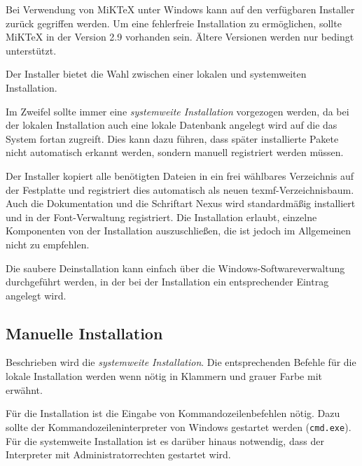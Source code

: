 Bei Verwendung von MiKTeX unter Windows kann auf den verfügbaren Installer
zurück gegriffen werden. Um eine fehlerfreie Installation zu ermöglichen,
sollte MiKTeX in der Version 2.9 vorhanden sein.
Ältere Versionen werden nur bedingt unterstützt.

Der Installer bietet die Wahl zwischen einer lokalen und systemweiten
Installation.
\begin{important}
Im Zweifel sollte immer eine \emph{systemweite Installation}
vorgezogen werden, da bei der lokalen Installation auch eine lokale
Datenbank angelegt wird auf die das System fortan zugreift.
Dies kann dazu führen, dass später installierte Pakete nicht automatisch
erkannt werden, sondern manuell registriert werden müssen.
\end{important}

Der Installer kopiert alle benötigten Dateien in ein frei wählbares Verzeichnis
auf der Festplatte und registriert dies automatisch als neuen texmf-Verzeichnisbaum.
Auch die Dokumentation und die Schriftart Nexus wird standardmäßig installiert
und in der Font-Verwaltung registriert.
Die Installation erlaubt, einzelne Komponenten von der Installation auszuschließen,
die ist jedoch im Allgemeinen nicht zu empfehlen.\par

Die saubere Deinstallation kann einfach über die Windows-Softwareverwaltung 
durchgeführt werden, in der bei der Installation ein entsprechender Eintrag
angelegt wird.

\newcommand\localinstall[1]{%
  {\leavevmode\color{tuGray80}(#1)}%
}

\subsection{Manuelle Installation} %

Beschrieben wird die \emph{systemweite Installation}.
Die entsprechenden Befehle für die lokale Installation werden wenn nötig
in Klammern und grauer Farbe mit erwähnt.

Für die Installation ist die Eingabe von Kommandozeilenbefehlen nötig.
Dazu sollte der Kommandozeileninterpreter von Windows gestartet
werden (\lstinline{cmd.exe}). Für die systemweite Installation ist es
darüber hinaus notwendig, dass der Interpreter mit
Administratorrechten gestartet wird. %

